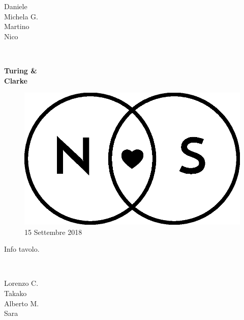 \documentclass[20pt]{extarticle}
\begin{document}
\newpage
\begin{center}
\begin{minipage}[c][\textheight]{0.25\textwidth}
\raggedleft
{\Large Daniele\\
Michela G.\\
Martino\\
Nico\\
}
\end{minipage}%
\begin{minipage}[c][\textheight]{0.05\textwidth}
\raggedleft
{\ \\}
\end{minipage}%
\begin{minipage}[c][\textheight]{0.5\textwidth}
\centering
{\Huge \textbf{Turing \&\\ Clarke}}\par\bigskip
\vfill
\begin{figure}[H]
\centering
\includegraphics[scale=0.5]{img/Logo_piccolo.eps}
\vfill
\small15 Settembre 2018\\
\end{figure}
\vfill
Info tavolo.
\vfill
\end{minipage}%
\begin{minipage}[c][\textheight]{0.05\textwidth}
\raggedright
{\ \\}
\end{minipage}%
\begin{minipage}[c][\textheight]{0.25\textwidth}
\raggedright
{\Large Lorenzo C.\\
Takako\\
Alberto M.\\
Sara\\}
\end{minipage}
\end{center}
\end{document}
